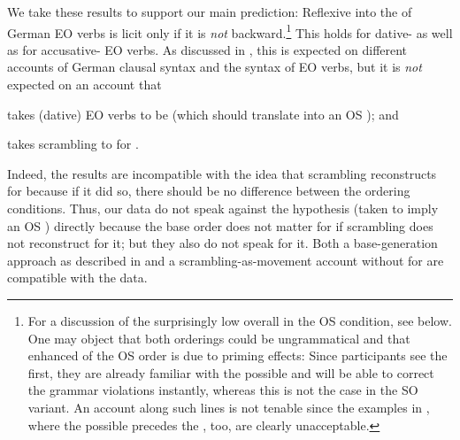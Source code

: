 \documentclass[output=paper,colorlinks,citecolor=brown]{langscibook}
\begin{document}
We take these results to support our main prediction: Reflexive  into the  of German EO verbs is licit only if it is \emph{not} backward.\footnote{For a discussion of the surprisingly low overall  in the OS condition, see below. One may object that both orderings could be ungrammatical and that enhanced  of the OS order is due to priming effects: Since participants see the   first, they are already familiar with the possible  and will be able to correct the grammar violations instantly, whereas this is not the case in the SO variant. An account along such lines is not tenable since the examples in , where the possible  precedes the , too, are clearly unacceptable.}
This holds for dative- as well as for accusative- EO verbs.
As discussed in , this is expected on different accounts of German clausal syntax and the syntax of EO verbs, but it is \emph{not} expected on an account that 
\begin{inparaenum}[i)]
\item takes (dative) EO verbs to be  (which should translate into an OS ); and
\item takes scrambling to  for  .    
\end{inparaenum}
Indeed, the results are incompatible with the idea that scrambling reconstructs for  because if it did so, there should be no difference between the ordering conditions. Thus, our data do not speak against the  hypothesis (taken to imply an OS ) directly because the base order does not matter for   if scrambling does not reconstruct for it; but they also do not speak for it.
Both a base-generation approach as described in  and a scrambling-as-movement account without  for   are compatible with the data.
\end{document}

